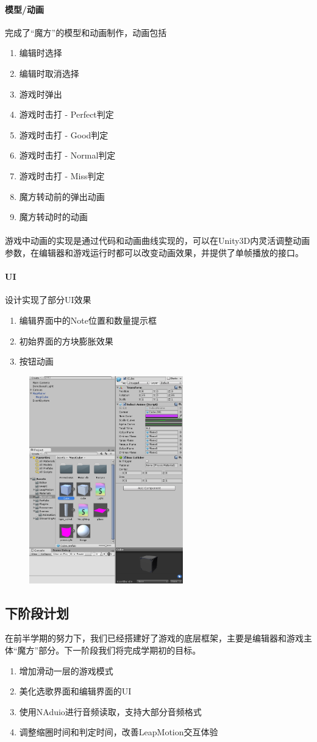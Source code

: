 \documentclass{article}
\begin{document}
\paragraph{模型/动画}
完成了“魔方”的模型和动画制作，动画包括
\begin{enumerate}
  \item 编辑时选择
  \item 编辑时取消选择
  \item 游戏时弹出
  \item 游戏时击打 - Perfect判定
  \item 游戏时击打 - Good判定
  \item 游戏时击打 - Normal判定
  \item 游戏时击打 - Miss判定
  \item 魔方转动前的弹出动画
  \item 魔方转动时的动画
\end{enumerate}
\paragraph{}
游戏中动画的实现是通过代码和动画曲线实现的，可以在Unity3D内灵活调整动画参数，在编辑器和游戏运行时都可以改变动画效果，并提供了单帧播放的接口。
\paragraph{UI}
设计实现了部分UI效果
\begin{enumerate}
	\item 编辑界面中的Note位置和数量提示框
	\item 初始界面的方块膨胀效果
	\item 按钮动画
\end{enumerate}
\begin{figure}[H]
  \centering
  \includegraphics[width=18em]{work1.png}\\
  \caption{}\label{}
\end{figure}
\newpage
\subsection{下阶段计划}
在前半学期的努力下，我们已经搭建好了游戏的底层框架，主要是编辑器和游戏主体“魔方”部分。下一阶段我们将完成学期初的目标。
\begin{enumerate}
  \item 增加滑动一层的游戏模式
  \item 美化选歌界面和编辑界面的UI
  \item 使用NAduio进行音频读取，支持大部分音频格式
  \item 调整缩圈时间和判定时间，改善LeapMotion交互体验
\end{enumerate}
\end{document}
